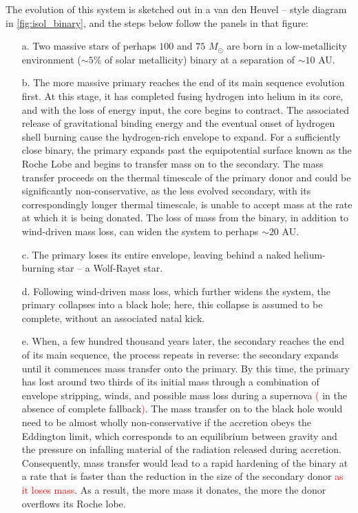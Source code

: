 \documentclass[iop,onecolumn]{revtex4}
\newcommand{\ajf}[1]{\textcolor{red}{#1}}
\begin{document}
The evolution of this system is sketched out in a van den Heuvel -- style diagram in \autoref{fig:isol_binary}, and the steps below follow the panels in that figure:
\begin{enumerate}  
\item[a.] Two massive stars of perhaps $100$ and $75$ $M_{\odot}$ are born in a low-metallicity environment ($\sim 5\%$ of solar metallicity)  binary at a separation of $\sim 10$ AU.  
\item[b.] The more massive primary reaches the end of its main sequence evolution first.  At this stage, it has completed fusing hydrogen into helium in its core, and with the loss of energy input, the core begins to contract.  The associated release of gravitational binding energy and the eventual onset of hydrogen shell burning cause the hydrogen-rich envelope to expand.  For a sufficiently close binary, the primary expands past the equipotential surface known as the Roche Lobe and begins to transfer mass on to the secondary.  The mass transfer proceeds on the thermal timescale of the primary donor and could be significantly non-conservative, as the less evolved secondary, with its correspondingly longer thermal timescale, is unable to accept mass at the rate at which it is being donated.  The loss of mass from the binary, in addition to wind-driven mass loss, can widen the system to perhaps $\sim 20$ AU.  
\item[c.] The primary loses its entire envelope, leaving behind a naked helium-burning star -- a Wolf-Rayet star.  
\item[d.] Following wind-driven mass loss, which further widens the system, the primary collapses into a black hole; here, this collapse is assumed to be complete, without an associated natal kick.  
\item[e.] When, a few hundred thousand years later, the secondary reaches the end of its main sequence, the process repeats in reverse: the secondary expands until it commences mass transfer onto the primary.  By this time, the primary has lost around two thirds of its initial mass through a combination of envelope stripping, winds, and possible mass loss during a supernova \ajf{(} in the absence of complete fallback\ajf{)}.  The mass transfer on to the black hole would need to be almost wholly non-conservative if the accretion obeys the Eddington limit, which corresponds to an equilibrium between gravity and the pressure on infalling material of the radiation released during accretion.  Consequently, mass transfer would lead to a rapid hardening of the binary at a rate that is faster than the reduction in the size of the secondary donor \ajf{as it loses mass}.  As a result, the more mass it donates, the more the donor overflows its Roche lobe.  

\end{enumerate}
\end{document}
